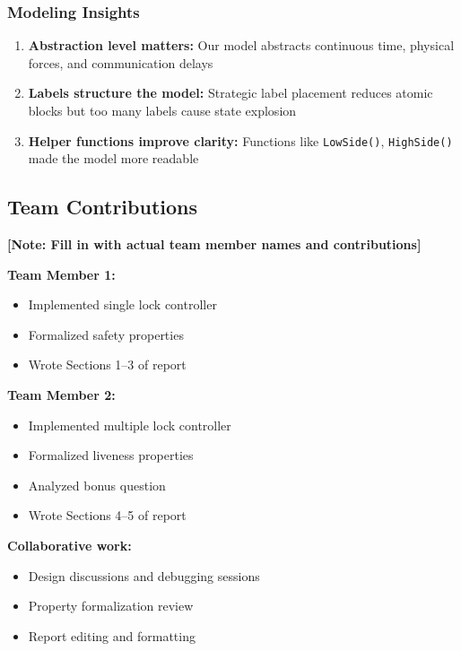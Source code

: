 \documentclass[12pt,a4paper]{article}
\begin{document}
\subsubsection{Modeling Insights}

\begin{enumerate}
    \item \textbf{Abstraction level matters:} Our model abstracts continuous time, physical forces, and communication delays
    \item \textbf{Labels structure the model:} Strategic label placement reduces atomic blocks but too many labels cause state explosion
    \item \textbf{Helper functions improve clarity:} Functions like \texttt{LowSide()}, \texttt{HighSide()} made the model more readable
\end{enumerate}

\subsection{Team Contributions}

\textbf{[Note: Fill in with actual team member names and contributions]}

\textbf{Team Member 1:}
\begin{itemize}
    \item Implemented single lock controller
    \item Formalized safety properties
    \item Wrote Sections 1--3 of report
\end{itemize}

\textbf{Team Member 2:}
\begin{itemize}
    \item Implemented multiple lock controller
    \item Formalized liveness properties
    \item Analyzed bonus question
    \item Wrote Sections 4--5 of report
\end{itemize}

\textbf{Collaborative work:}
\begin{itemize}
    \item Design discussions and debugging sessions
    \item Property formalization review
    \item Report editing and formatting
\end{itemize}
\end{document}
